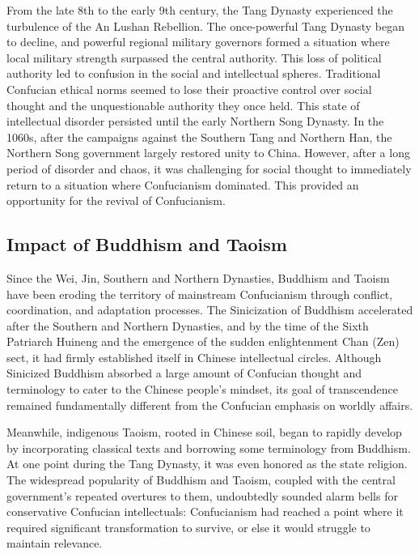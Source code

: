 \documentclass[
]{book}
\begin{document}
From the late 8th to the early 9th century, the Tang Dynasty experienced the turbulence of the An Lushan Rebellion. The once-powerful Tang Dynasty began to decline, and powerful regional military governors formed a situation where local military strength surpassed the central authority. This loss of political authority led to confusion in the social and intellectual spheres. Traditional Confucian ethical norms seemed to lose their proactive control over social thought and the unquestionable authority they once held. This state of intellectual disorder persisted until the early Northern Song Dynasty. In the 1060s, after the campaigns against the Southern Tang and Northern Han, the Northern Song government largely restored unity to China. However, after a long period of disorder and chaos, it was challenging for social thought to immediately return to a situation where Confucianism dominated. This provided an opportunity for the revival of Confucianism.

\hypertarget{impact-of-buddhism-and-taoism}{%
\subsection{Impact of Buddhism and Taoism}\label{impact-of-buddhism-and-taoism}}

Since the Wei, Jin, Southern and Northern Dynasties, Buddhism and Taoism have been eroding the territory of mainstream Confucianism through conflict, coordination, and adaptation processes. The Sinicization of Buddhism accelerated after the Southern and Northern Dynasties, and by the time of the Sixth Patriarch Huineng and the emergence of the sudden enlightenment Chan (Zen) sect, it had firmly established itself in Chinese intellectual circles. Although Sinicized Buddhism absorbed a large amount of Confucian thought and terminology to cater to the Chinese people's mindset, its goal of transcendence remained fundamentally different from the Confucian emphasis on worldly affairs.

Meanwhile, indigenous Taoism, rooted in Chinese soil, began to rapidly develop by incorporating classical texts and borrowing some terminology from Buddhism. At one point during the Tang Dynasty, it was even honored as the state religion. The widespread popularity of Buddhism and Taoism, coupled with the central government's repeated overtures to them, undoubtedly sounded alarm bells for conservative Confucian intellectuals: Confucianism had reached a point where it required significant transformation to survive, or else it would struggle to maintain relevance.
\end{document}
